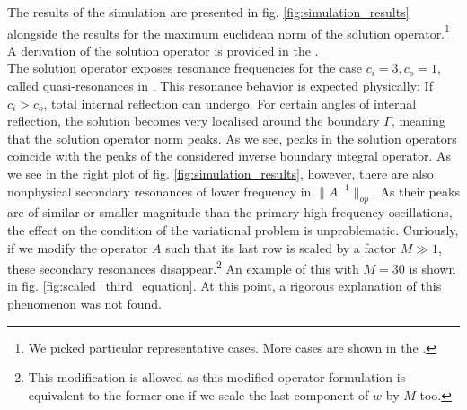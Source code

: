 \documentclass[12pt,journal,compsoc, onecolumn]{IEEEtran}
\begin{document}
\noindent
The results of the simulation are presented in fig. \ref{fig:simulation_results}  alongside the results for the maximum euclidean norm of the solution operator.\footnote{We picked particular representative cases. More cases are shown in the .} A derivation of the solution operator is provided in the . \\
The solution operator exposes resonance frequencies for the case $c_i = 3, c_o =1$, called  quasi-resonances  in \cite{hiptmair2021spurious}. This resonance behavior is expected physically: If $c_i > c_o$, total internal reflection can undergo. For certain angles of internal reflection, the solution becomes very localised around the boundary $\Gamma$, meaning that the solution operator norm peaks. As we see, peaks in the solution operators coincide with the peaks of the considered inverse boundary integral operator. As we see in the right plot of fig. \ref{fig:simulation_results}, however, there are also nonphysical secondary resonances of lower frequency in $\|A^{-1}\|_{op}$. As their peaks are of similar or smaller magnitude than the primary high-frequency oscillations, the effect on the condition of the variational problem is unproblematic. Curiously, if we modify the operator $A$ such that its last row is scaled by a factor $M \gg 1$, these secondary resonances disappear.\footnote{This modification is allowed as this modified operator formulation is equivalent to the former one if we scale the last component of $w$ by $M$ too.} An example of this with $M = 30$ is shown in fig.  \ref{fig:scaled_third_equation}. At this point, a rigorous explanation of this phenomenon was not found. 
\end{document}
